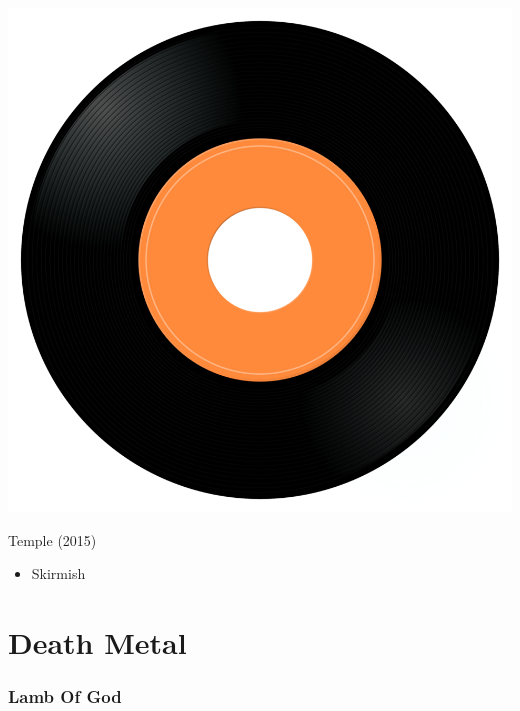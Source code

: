 \begin{minipage}[t]{0.25\textwidth}\vspace{0pt}
\captionsetup{type=figure}
\includegraphics[width=\textwidth]{Images/cover.png}
\caption*{Temple (2015)}
\end{minipage}
\begin{minipage}[t]{0.25\textwidth}\vspace{0pt}
\begin{itemize}[nosep,leftmargin=1em,labelwidth=*,align=left]
	\setlength{\itemsep}{0pt}
	\item Skirmish
\end{itemize}
\end{minipage}

\cleardoublepage
\section{Death Metal}

\subsubsection{Lamb Of God}

